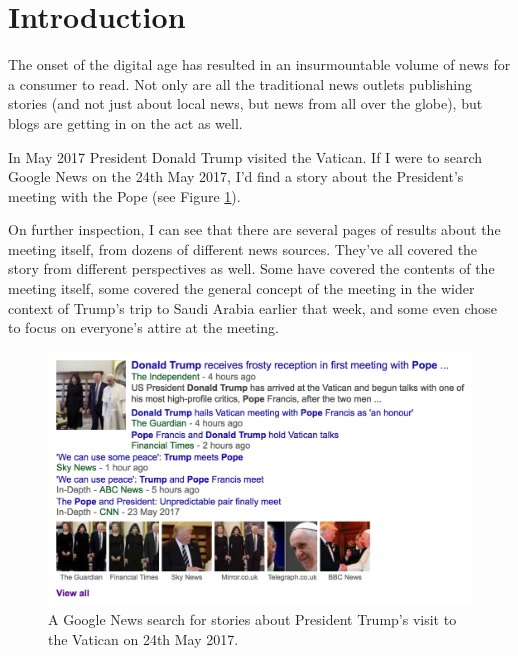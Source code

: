 \documentclass[12pt]{article}
\begin{document}
\clearpage

\doublespacing
\tableofcontents
\pagebreak
\singlespacing



\section{Introduction}

\label{intro}

The onset of the digital age has resulted in an insurmountable volume of news for a consumer to read. Not only are all the traditional news outlets publishing stories (and not just about local news, but news from all over the globe), but blogs are getting in on the act as well. 

In May 2017 President Donald Trump visited the Vatican. If I were to search Google News \cite{googleNews} on the 24th May 2017, I'd find a story about the President's meeting with the Pope (see Figure \ref{DonaldTrumpPope}). 

On further inspection, I can see that there are several pages of results about the meeting itself, from dozens of different news sources. They've all covered the story from different perspectives as well. Some have covered the contents of the meeting itself, some covered the general concept of the meeting in the wider context of Trump's trip to Saudi Arabia earlier that week, and some even chose to focus on everyone's attire at the meeting.

\begin{figure}[h]
  \centering
    \includegraphics[width=\textwidth]{DonaldTrumpPope.png}
   \caption[A Google News Search on 24th May 2017]{A Google News search for stories about President Trump's visit to the Vatican on 24th May 2017.}
   \label{DonaldTrumpPope}
\end{figure}
\end{document}
